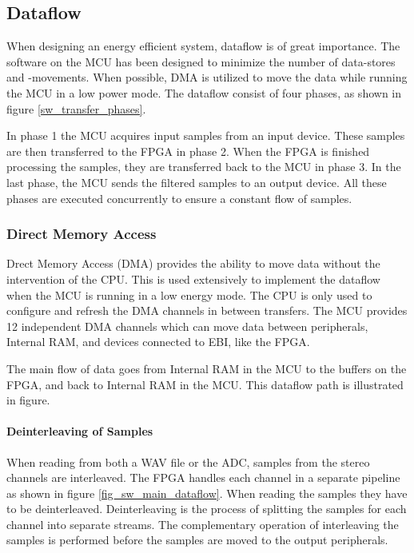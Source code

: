
\subsection{Dataflow}
When designing an energy efficient system, dataflow is of great importance. The
software on the MCU has been designed to minimize the number of data-stores and
-movements. When possible, DMA is utilized to move the data while running the
MCU in a low power mode. The dataflow consist of four phases, as shown in figure
\ref{sw_transfer_phases}.

In phase 1 the MCU acquires input samples from an input device. These samples
are then transferred to the FPGA in phase 2. When the FPGA is finished
processing the samples, they are transferred back to the MCU in phase 3. In the
last phase, the MCU sends the filtered samples to an output device. All these
phases are executed concurrently to ensure a constant flow of samples.



\subsubsection{Direct Memory Access}
Drect Memory Access (DMA) provides the ability to move data
without the intervention of the CPU. This is used extensively to implement the
dataflow when the MCU is running in a low energy mode. The CPU is only used to configure
and refresh the DMA channels in between transfers. The MCU provides 12
independent DMA channels which can move data between peripherals, Internal RAM, and
devices connected to EBI, like the FPGA.

The main flow of data goes from Internal RAM in the MCU to the buffers on
the FPGA, and back to Internal RAM in the MCU. This dataflow path is illustrated in figure.

% 

\paragraph{Deinterleaving of Samples}
When reading from both a WAV file or the ADC, samples from the stereo channels
are interleaved. The FPGA handles each channel in a separate pipeline as shown
in figure \ref{fig_sw_main_dataflow}.
When reading the samples they have to be deinterleaved. Deinterleaving is the
process of splitting the samples for each channel into separate streams.
The complementary operation of interleaving the samples is performed before the samples
are moved to the output peripherals.

